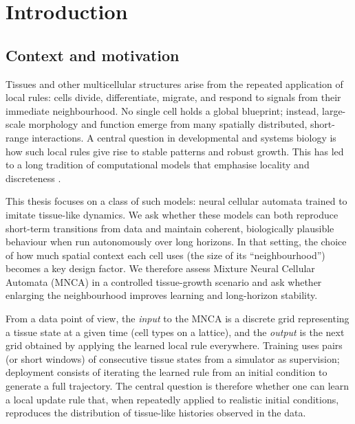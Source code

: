 \chapter{Introduction}
\label{c:intro}

\section{Context and motivation}
\label{sec:intro:context}

Tissues and other multicellular structures arise from the repeated application of local rules: cells divide, differentiate, migrate, and respond to signals from their immediate neighbourhood.
No single cell holds a global blueprint; instead, large-scale morphology and function emerge from many spatially distributed, short-range interactions.
A central question in developmental and systems biology is how such local rules give rise to stable patterns and robust growth. This has led to a long tradition of computational models that emphasise locality and discreteness \cite{ca_vonneumann1966}.

This thesis focuses on a class of such models: neural cellular automata \cite{nca_mordvintsev2020} trained to imitate tissue-like dynamics.
We ask whether these models can both reproduce short-term transitions from data and maintain coherent, biologically plausible behaviour when run autonomously over long horizons.
In that setting, the choice of how much spatial context each cell uses (the size of its ``neighbourhood'') becomes a key design factor.
We therefore assess Mixture Neural Cellular Automata (MNCA) \cite{mnca_milite2025} in a controlled tissue-growth scenario and ask whether enlarging the neighbourhood improves learning and long-horizon stability.

From a data point of view, the \emph{input} to the MNCA is a discrete grid representing a tissue state at a given time (cell types on a lattice), and the \emph{output} is the next grid obtained by applying the learned local rule everywhere.
Training uses pairs (or short windows) of consecutive tissue states from a simulator as supervision; deployment consists of iterating the learned rule from an initial condition to generate a full trajectory.
The central question is therefore whether one can learn a local update rule that, when repeatedly applied to realistic initial conditions, reproduces the distribution of tissue-like histories observed in the data.

